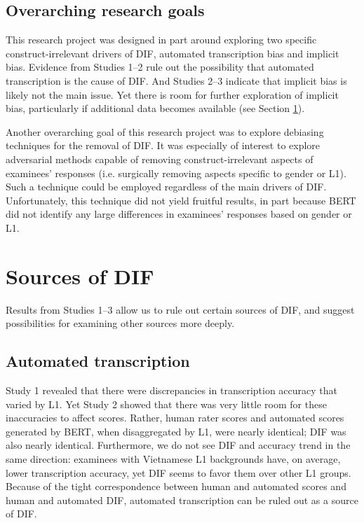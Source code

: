 \documentclass [PhD] {uclathes}
\begin{document}
\subsection{Overarching research goals}

This research project was designed in part around exploring two specific construct-irrelevant drivers of DIF, automated transcription bias and implicit bias. Evidence from Studies 1–2 rule out the possibility that automated transcription is the cause of DIF. And Studies 2–3 indicate that implicit bias is likely not the main issue. Yet there is room for further exploration of implicit bias, particularly if additional data becomes available (see Section \ref{sec:disc_sources}). 

Another overarching goal of this research project was to explore debiasing techniques for the removal of DIF. It was especially of interest to explore adversarial methods capable of removing construct-irrelevant aspects of examinees’ responses (i.e. surgically removing aspects specific to gender or L1). Such a technique could be employed regardless of the main drivers of DIF. Unfortunately, this technique did not yield fruitful results, in part because BERT did not identify any large differences in examinees’ responses based on gender or L1. 

\section{Sources of DIF}
\label{sec:disc_sources}

Results from Studies 1–3 allow us to rule out certain sources of DIF, and suggest possibilities for examining other sources more deeply. 

\subsection{Automated transcription}

Study 1 revealed that there were discrepancies in transcription accuracy that varied by L1. Yet Study 2 showed that there was very little room for these inaccuracies to affect scores. Rather, human rater scores and automated scores generated by BERT, when disaggregated by L1, were nearly identical; DIF was also nearly identical. Furthermore, we do not see DIF and accuracy trend in the same direction: examinees with Vietnamese L1 backgrounds have, on average, lower transcription accuracy, yet DIF seems to favor them over other L1 groups. Because of the tight correspondence between human and automated scores and human and automated DIF, automated transcription can be ruled out as a source of DIF. 
\end{document}
